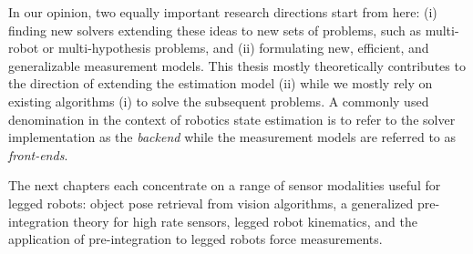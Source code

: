 In our opinion, two equally important research directions start from here: (i) finding new solvers extending these ideas to new sets of problems, such as multi-robot or multi-hypothesis problems, and (ii)
formulating new, efficient, and generalizable measurement models. This thesis mostly theoretically contributes to the direction of extending
the estimation model (ii) while we mostly rely on existing algorithms (i) to solve the subsequent problems.
A commonly used denomination in the context of robotics state estimation is to refer to the solver implementation as the \textit{backend} while the measurement models are referred to as \textit{front-ends}.

The next chapters each concentrate on a range of sensor modalities useful for legged robots:
object pose retrieval from vision algorithms, a generalized pre-integration theory for high rate sensors, legged robot kinematics, and the application 
of pre-integration to legged robots force measurements.





